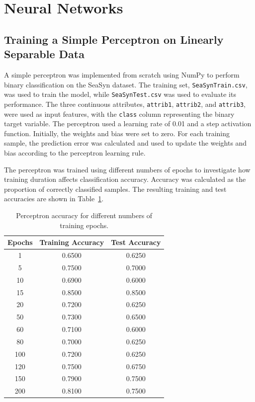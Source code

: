 \documentclass[a4paper,12pt]{article}
\begin{document}
\section{Neural Networks}
\subsection{Training a Simple Perceptron on Linearly Separable Data}

A simple perceptron was implemented from scratch using NumPy to perform binary classification on the SeaSyn dataset. The training set, \texttt{SeaSynTrain.csv}, was used to train the model, while \texttt{SeaSynTest.csv} was used to evaluate its performance. The three continuous attributes, \texttt{attrib1}, \texttt{attrib2}, and \texttt{attrib3}, were used as input features, with the \texttt{class} column representing the binary target variable. The perceptron used a learning rate of 0.01 and a step activation function. Initially, the weights and bias were set to zero. For each training sample, the prediction error was calculated and used to update the weights and bias according to the perceptron learning rule.

The perceptron was trained using different numbers of epochs to investigate how training duration affects classification accuracy. Accuracy was calculated as the proportion of correctly classified samples. The resulting training and test accuracies are shown in Table~\ref{tab:perceptron_results}.

\begin{table}[ht]
	\centering
	\caption{Perceptron accuracy for different numbers of training epochs.}
	\label{tab:perceptron_results}
	\begin{tabular}{c|c|c}
		\hline
		\textbf{Epochs} & \textbf{Training Accuracy} & \textbf{Test Accuracy} \\
		\hline
		1   & 0.6500 & 0.6250 \\
		5   & 0.7500 & 0.7000 \\
		10  & 0.6900 & 0.6000 \\
		15  & 0.8500 & 0.8500 \\
		20  & 0.7200 & 0.6250 \\
		50  & 0.7300 & 0.6500 \\
		60  & 0.7100 & 0.6000 \\
		80  & 0.7000 & 0.6250 \\
		100 & 0.7200 & 0.6250 \\
		120 & 0.7500 & 0.6750 \\
		150 & 0.7900 & 0.7500 \\
		200 & 0.8100 & 0.7500 \\
		\hline
	\end{tabular}
\end{table}
\end{document}

